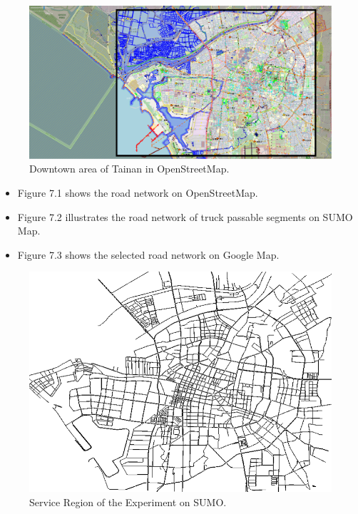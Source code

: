 \documentclass[12pt]{ksthesis}
\begin{document}
\begin{thesis}
{\begin{figure}[H]
\centering
\includegraphics[width=1.0\textwidth]{./Thesis_figures/F7-1_Openstreetmap.PNG}
\caption{\large Downtown area of Tainan in OpenStreetMap.}
\vspace{0.5cm}
\label{Fig:DowntownArea_in_OpenStreetMap.}
\end{figure}


\begin{itemize}
\item
Figure 7.1 shows the road network on OpenStreetMap.

\item
Figure 7.2 illustrates the road network of truck passable segments on SUMO Map.

\item
Figure 7.3 shows the selected road network on Google Map.

\end{itemize}

\begin{figure}[H]
\centering
\includegraphics[width=1.0\textwidth]{./Thesis_figures/F7-2_SUMOMap.PNG}
\caption{\large  Service Region of the Experiment on SUMO.}
\vspace{0.5cm}
\label{Fig:SUMOMap}
\end{figure}

}
\end{thesis}
\end{document}
